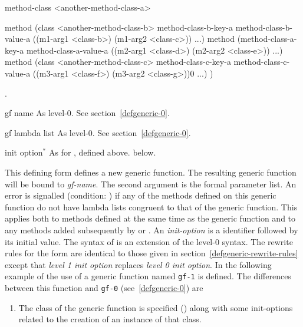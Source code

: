 \begin{optDefinition}
{  method-class <another-method-class-a>

  method (class <another-method-class-b>
          method-class-b-key-a method-class-b-value-a
          ((m1-arg1 <class-b>) (m1-arg2 <class-c>))
          ...)
  method (method-class-a-key-a method-class-a-value-a
          ((m2-arg1 <class-d>) (m2-arg2 <class-e>))
          ...)
  method (class <another-method-class-c>
          method-class-c-key-a method-class-c-value-a
          ((m3-arg1 <class-f>) (m3-arg2 <class-g>))0
          ...)
)
\endCodeExample}
%
\seealso%
.

\label{defgeneric-1}
%
\Syntax
{}
%
\begin{arguments}
    \item[gf name] As level-0.  See section~\ref{defgeneric-0}.

    \item[gf lambda list] As level-0.  See section~\ref{defgeneric-0}.

    \item[init option\/$^*$] As for , defined above.
    below.
\end{arguments}
%
\remarks%
This defining form defines a new generic function.  The resulting generic
function will be bound to {\em gf-name}.  The second argument is the formal
parameter list.  An error is signalled (condition:
) if any of the methods defined on
this generic function do not have lambda lists congruent to that of the generic
function.  This applies both to methods defined at the same time as the generic
function and to any methods added subsequently by  or
.  An {\em init-option} is a identifier followed by its
initial value.  The syntax of  is an extension of the
level-0 syntax.  The rewrite rules for the  form are
identical to those given in section~\ref{defgeneric-rewrite-rules} except that
{\em level 1 init option} replaces {\em level 0 init option}.
%
\examples
In the following example of the use of  a generic
function named {\tt gf-1} is defined.  The differences between this
function and {\tt gf-0} (see~\ref{defgeneric-0}) are
\begin{enumerate}
    \item The class of the generic function is specified
    () along with some init-options related to the
    creation of an instance of that class.


\end{enumerate}
\end{optDefinition}

